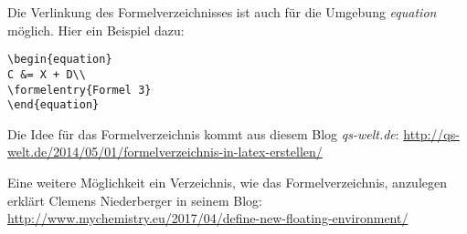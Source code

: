 Die Verlinkung des Formelverzeichnisses ist auch für die Umgebung \emph{equation} möglich. Hier ein Beispiel dazu: 

\begin{lstlisting}[style=Latex]
\begin{equation}
C &= X + D\\
\formelentry{Formel 3}
\end{equation}
\end{lstlisting}

Die Idee für das Formelverzeichnis kommt aus diesem Blog \emph{qs-welt.de}:
\url{http://qs-welt.de/2014/05/01/formelverzeichnis-in-latex-erstellen/}

Eine weitere Möglichkeit ein Verzeichnis, wie das Formelverzeichnis, anzulegen erklärt Clemens Niederberger in seinem Blog: \url{http://www.mychemistry.eu/2017/04/define-new-floating-environment/}
